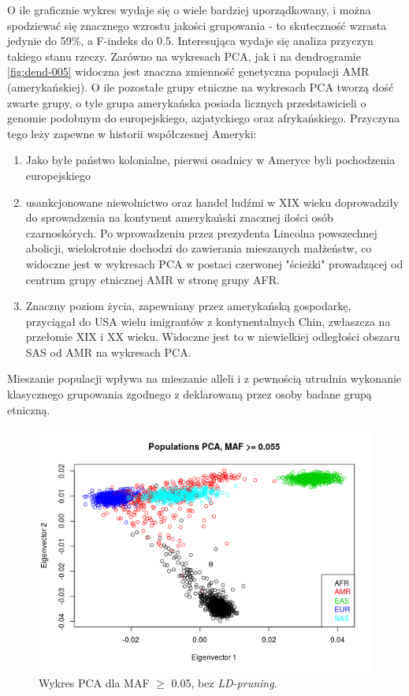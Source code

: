 \documentclass[a4paper]{article}
\begin{document}
\begin{enumerate}
O ile graficznie wykres wydaje się o wiele bardziej uporządkowany, i można spodziewać się znacznego wzrostu jakości grupowania - to skuteczność wzrasta jedynie do 59\%, a F-indeks do 0.5. Interesująca wydaje się analiza przyczyn takiego stanu rzeczy. Zarówno na wykresach PCA, jak i na dendrogramie \ref{fig:dend-005} widoczna jest znaczna zmienność genetyczna populacji AMR (amerykańskiej). O ile pozostałe grupy etniczne na wykresach PCA tworzą dość zwarte grupy, o tyle grupa amerykańska posiada licznych przedstawicieli o genomie podobnym do europejskiego, azjatyckiego oraz afrykańskiego. Przyczyna tego leży zapewne w historii współczesnej Ameryki:
\begin{enumerate}
\item Jako byłe państwo kolonialne, pierwsi osadnicy w Ameryce byli pochodzenia europejskiego
\item usankcjonowane niewolnictwo oraz handel ludźmi w XIX wieku doprowadziły do sprowadzenia na kontynent amerykański znacznej ilości osób czarnoskórych. Po wprowadzeniu przez prezydenta Lincolna powszechnej abolicji, wielokrotnie dochodzi do zawierania mieszanych małżeństw, co widoczne jest w wykresach PCA w postaci czerwonej "ścieżki" prowadzącej od centrum grupy etnicznej AMR w stronę grupy AFR. 
\item Znaczny poziom życia, zapewniany przez amerykańską gospodarkę, przyciągał do USA wielu imigrantów z kontynentalnych Chin, zwłaszcza na przełomie XIX i XX wieku. Widoczne jest to w niewielkiej odległości obszaru SAS od AMR na wykresach PCA. 
\end{enumerate}
Mieszanie populacji wpływa na mieszanie alleli i z pewnością utrudnia wykonanie klasycznego grupowania zgodnego z deklarowaną przez osoby badane grupą etniczną. 


\end{enumerate}

\begin{figure} 
\centering \includegraphics[width=13cm]{pca-nold.png}
\caption{Wykres PCA dla MAF $\geq$ 0.05, bez \emph{LD-pruning}. } \label{fig:nold}
\end{figure}
\end{document}
